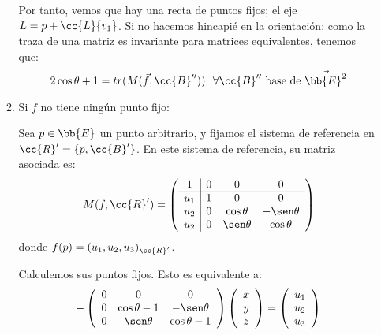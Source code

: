 \begin{enumerate}
\begin{enumerate}
        Por tanto, vemos que hay una recta de puntos fijos; el eje $L=p+\cc{L}\{v_1\}$.  Si no hacemos hincapié en la orientación; como la traza de una matriz es invariante para matrices equivalentes, tenemos que:
        \begin{equation*}
            2\cos \theta +1 = tr(M(\vec{f}, \cc{B}'')) ~~\forall \cc{B}'' \text{ base de }\vec{\bb{E}^2}
        \end{equation*}

        \item Si $f$ no tiene ningún punto fijo:

        Sea $p\in \bb{E}$ un punto arbitrario, y fijamos el sistema de referencia en $\cc{R}'=\{p,\cc{B}'\}$. En este sistema de referencia, su matriz asociada es:
        \begin{equation*}
            M(f,\cc{R}') = \left(\begin{array}{c|ccc}
                1 & 0 & 0 & 0 \\ \hline
                u_1 & 1 & 0 & 0\\ 
                u_2 & 0 & \cos\theta & -\sen\theta \\
                u_2 & 0 & \sen\theta & \cos\theta
            \end{array}\right)
        \end{equation*}
        donde $f(p)=(u_1,u_2,u_3)_{\cc{R}'}$.

        Calculemos sus puntos fijos. Esto es equivalente a:
        \begin{equation*}
            -\left(\begin{array}{ccc}
                0 & 0 & 0\\ 
                0 & \cos\theta-1 & -\sen\theta \\
                0 & \sen\theta & \cos\theta-1
            \end{array}\right)
            \left(\begin{array}{c}
                x\\y\\z
            \end{array}\right)
            = \left(\begin{array}{c}
                u_1\\u_2\\u_3
            \end{array}\right)
        \end{equation*}


\end{enumerate}
\end{enumerate}
